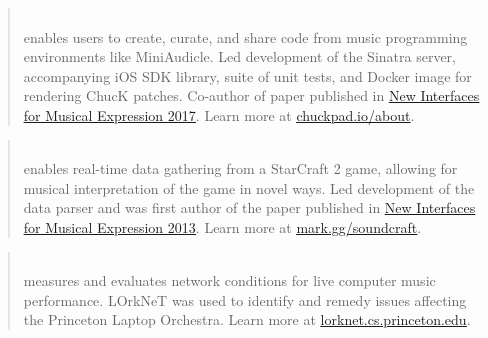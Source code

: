 

\begin{cvparagraph}


\begin{quote}
\\\leading{13pt} 
\thinspace enables users to create, curate, and share code from music programming environments like MiniAudicle. 
Led development of the Sinatra server, accompanying iOS SDK library, suite of unit tests, and Docker image for rendering ChucK patches. Co-author of paper published in \href{http://homes.create.aau.dk/dano/nime17/papers/0044/paper0044.pdf}{\underline{New Interfaces for Musical Expression 2017}}. 
Learn more at \href{chuckpad.io/about}{\underline{chuckpad.io/about}}.
\end{quote}

\begin{quote}
\\\leading{13pt}
\thinspace enables real-time data gathering from a StarCraft 2 game, allowing for musical interpretation of the game in novel ways. 
Led development of the data parser and was first author of the paper published in \href{http://www.nime.org/proceedings/2013/nime2013_146.pdf}{\underline{New Interfaces for Musical Expression 2013}}. 
Learn more at \href{mark.gg/soundcraft}{\underline{mark.gg/soundcraft}}.
\end{quote}

\begin{quote}
\\\leading{13pt}
\thinspace measures and evaluates network conditions for live computer music performance. 
LOrkNeT was used to identify and remedy issues affecting the Princeton Laptop Orchestra. 
Learn more at \href{lorknet.cs.princeton.edu}{\underline{lorknet.cs.princeton.edu}}.
\end{quote}

\end{cvparagraph}
